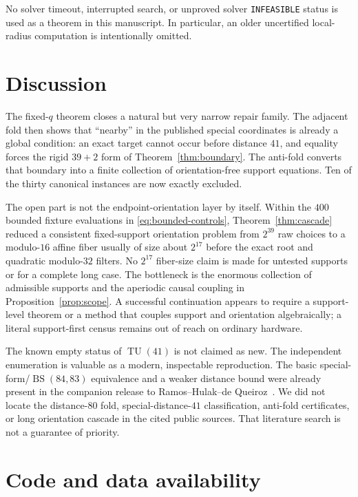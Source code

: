 \documentclass[11pt]{article}
\theoremstyle{remark}
\newcommand{\BS}{\operatorname{BS}}
\newcommand{\TU}{\operatorname{TU}}
\begin{document}
No solver timeout, interrupted search, or unproved solver
\texttt{INFEASIBLE} status is used as a theorem in this manuscript.  In
particular, an older uncertified local-radius computation is intentionally
omitted.

\section{Discussion}

The fixed-$q$ theorem closes a natural but very narrow repair family.
The adjacent fold then shows that ``nearby'' in the published special
coordinates is already a global condition: an exact target cannot occur
before distance $41$, and equality forces the rigid $39+2$ form of
Theorem~\ref{thm:boundary}.  The anti-fold converts that boundary into a
finite collection of orientation-free support equations.  Ten of the
thirty canonical instances are now exactly excluded.

The open part is not the endpoint-orientation layer by itself.
Within the $400$ bounded fixture evaluations in
\eqref{eq:bounded-controls}, Theorem~\ref{thm:cascade} reduced a consistent
fixed-support orientation problem from $2^{39}$ raw choices to a
modulo-$16$ affine fiber usually of size about $2^{17}$ before the exact
root and quadratic modulo-$32$ filters.  No $2^{17}$ fiber-size claim is
made for untested supports or for a complete long case.  The
bottleneck is the enormous collection of admissible supports and the
aperiodic causal coupling in Proposition~\ref{prop:scope}.  A successful
continuation appears to require a support-level theorem or a method that
couples support and orientation algebraically; a literal support-first
census remains out of reach on ordinary hardware.

The known empty status of $\TU(41)$ is not claimed as new.  The independent
enumeration is valuable as a modern, inspectable reproduction.  The basic
special-form/$\BS(84,83)$ equivalence and a weaker distance bound were
already present in the companion release to
Ramos--Hulak--de Queiroz~\cite{ramos-artifacts}.  We did not locate the
distance-$80$ fold, special-distance-$41$ classification, anti-fold
certificates, or long orientation cascade in the cited public sources.
That literature search is not a guarantee of priority.

\section*{Code and data availability}
\end{document}
